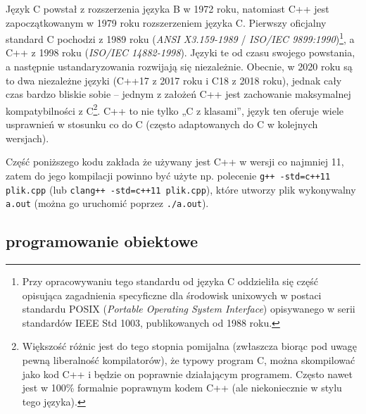 Język C powstał z rozszerzenia języka B w 1972 roku, natomiast C++ jest zapoczątkowanym w 1979 roku rozszerzeniem języka C.
Pierwszy oficjalny standard C pochodzi z 1989 roku (\textit{ANSI X3.159-1989} / \textit{ISO/IEC 9899:1990})\footnote{Przy opracowywaniu tego standardu od języka C oddzieliła się część opisująca zagadnienia specyficzne dla środowisk unixowych w postaci standardu POSIX (\textit{Portable Operating System Interface}) opisywanego w serii standardów IEEE Std 1003, publikowanych od 1988 roku.}, a C++ z 1998 roku (\textit{ISO/IEC 14882-1998}).
Języki te od czasu swojego powstania, a następnie ustandaryzowania rozwijają się niezależnie.
Obecnie, w 2020 roku są to dwa niezależne języki (C++17 z 2017 roku i C18 z 2018 roku), jednak cały czas bardzo bliskie sobie – jednym z założeń C++ jest zachowanie maksymalnej kompatybilności z C\footnote{
	Większość różnic jest do tego stopnia pomijalna (zwłaszcza biorąc pod uwagę pewną liberalność kompilatorów), że typowy program C, można skompilować jako kod C++ i będzie on poprawnie działającym programem.
	Często nawet jest w 100\% formalnie poprawnym kodem C++ (ale niekoniecznie w stylu tego języka).
}.
C++ to nie tylko „C z klasami”, język ten oferuje wiele usprawnień w stosunku co do C (często adaptowanych do C w kolejnych wersjach).

Część poniższego kodu zakłada że używany jest C++ w wersji co najmniej 11, zatem do jego kompilacji powinno być użyte np. polecenie \Verb#g++ -std=c++11 plik.cpp# (lub \Verb#clang++ -std=c++11 plik.cpp#), które utworzy plik wykonywalny \Verb#a.out# (można go uruchomić poprzez \Verb#./a.out#).

\subsection{programowanie obiektowe}

